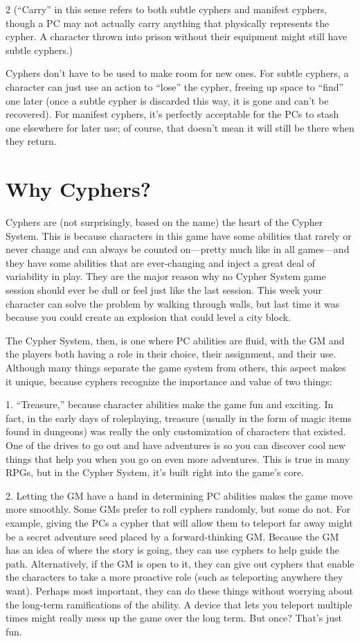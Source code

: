 \begin{multicols}{2}
(“Carry” in this sense refers to both subtle cyphers and manifest cyphers, though a PC may not actually carry anything that physically represents the cypher. A character thrown into prison without their equipment might still have subtle cyphers.)

Cyphers don’t have to be used to make room for new ones. For subtle cyphers, a character can just use an action to “lose” the cypher, freeing up space to “find” one later (once a subtle cypher is discarded this way, it is gone and can’t be recovered). For manifest cyphers, it’s perfectly acceptable for the PCs to stash one elsewhere for later use; of course, that doesn’t mean it will still be there when they return.

\chapter{Why Cyphers?}

Cyphers are (not surprisingly, based on the name) the heart of the Cypher System. This is because characters in this game have some abilities that rarely or never change and can always be counted on—pretty much like in all games—and they have some abilities that are ever-changing and inject a great deal of variability in play. They are the major reason why no Cypher System game session should ever be dull or feel just like the last session. This week your character can solve the problem by walking through walls, but last time it was because you could create an explosion that could level a city block.

The Cypher System, then, is one where PC abilities are fluid, with the GM and the players both having a role in their choice, their assignment, and their use. Although many things separate the game system from others, this aspect makes it unique, because cyphers recognize the importance and value of two things:

1. “Treasure,” because character abilities make the game fun and exciting. In fact, in the early days of roleplaying, treasure (usually in the form of magic items found in dungeons) was really the only customization of characters that existed. One of the drives to go out and have adventures is so you can discover cool new things that help you when you go on even more adventures. This is true in many RPGs, but in the Cypher System, it’s built right into the game’s core.

2. Letting the GM have a hand in determining PC abilities makes the game move more smoothly. Some GMs prefer
to roll cyphers randomly, but some do not. For example, giving the PCs a cypher that will allow them to teleport far away might be a secret adventure seed placed by a forward-thinking GM. Because the GM has an idea of where the story is going, they can use cyphers to help guide the path. Alternatively, if the GM is open to it, they can give out cyphers that enable the characters to take a more proactive role (such as teleporting anywhere they want). Perhaps most important, they can do these things without worrying about the long-term ramifications of the ability. A device that lets you teleport multiple times might really mess up the game over the long term. But once? That’s just fun.


\end{multicols}
